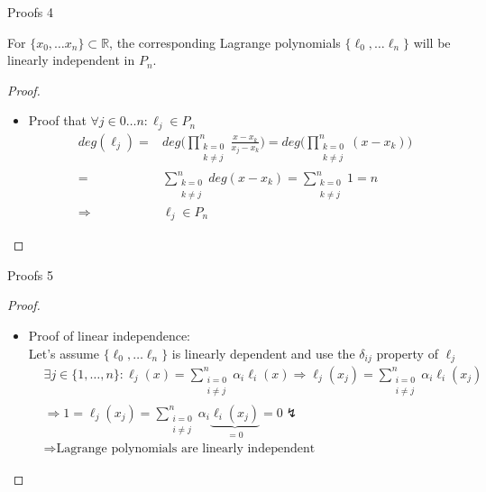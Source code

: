 \documentclass[8pt]{beamer}
\begin{document}
		\begin{frame}{Proofs 4}
			\begin{theorem}
				For $\{x_0, \ldots x_n \}\subset \mathbb{R}$, the corresponding Lagrange polynomials $\{\ell_0, \ldots \ell_n \}$ will be linearly independent in $P_n$.
			\end{theorem}
			\begin{proof}
				\begin{itemize}
					\item 
					Proof that $\forall j \in 0\ldots n: \ell_j \in P_n$\\
					\begin{align*}
						\displaystyle deg(\ell_j) =& deg\bigg(\prod_{\substack{k= 0 \\ k \neq j }}^{n}\frac{x - x_k}{x_j - x_k}\bigg) =deg\bigg( \prod_{\substack{k= 0 \\ k \neq j }}^{n}(x-x_k)\bigg) \\=& \sum_{\substack{k= 0 \\ k \neq j }}^{n} deg(x-x_k) = \sum_{\substack{k= 0 \\ k \neq j }}^{n} 1 = n\\
						\Rightarrow& \ell_j \in P_n
					\end{align*}
				
				\end{itemize}
			\end{proof}
		\end{frame}
		\begin{frame}{Proofs 5}
			\begin{proof}
				\begin{itemize}
					\item Proof of linear independence:\\
					Let's assume $\{\ell_0, \ldots \ell_n \}$ is linearly dependent and use the $\delta_{ij}$ property of $\ell_j$
					\begin{align*}
						&\exists j \in \{1, \ldots ,n \} : \ell_j(x) = \sum_{\substack{i= 0 \\ i \neq j }}^{n} \alpha_i \ell_i(x)
						\Rightarrow  \ell_j(x_j) = \sum_{\substack{i= 0 \\ i \neq j }}^{n} \alpha_i \ell_i(x_j)\\
						&\Rightarrow 1 = \ell_j(x_j) = \sum_{\substack{i= 0 \\ i \neq j }}^{n} \alpha_i \underbrace{\ell_i(x_j)}_{=0} = 0 \lightning\\& \Rightarrow \text{Lagrange polynomials are linearly independent}
					\end{align*}
				\end{itemize}
			\end{proof}
		\end{frame}
									
\end{document}
